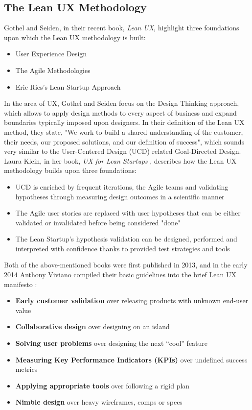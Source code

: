 \documentclass{article}
\begin{document}
\subsection{The Lean UX Methodology}
Gothel and Seiden, in their recent book, \textit{Lean UX}, \cite{gothelf2016lean} highlight three foundations upon which the Lean UX methodology is built:
\begin{itemize}
  \item User Experience Design
  \item The Agile Methodologies
  \item Eric Ries's Lean Startup Approach
\end{itemize}
In the area of UX, Gothel and Seiden focus on the Design Thinking approach, which allows to apply design methods to every aspect of business and expand boundaries typically imposed upon designers. In their definition of the Lean UX method, they state, "We work to build a shared understanding of the customer, their needs, our
proposed solutions, and our definition of success", which sounds very similar to the User-Centered Design (UCD) related Goal-Directed Design.
Laura Klein, in her book, \textit{UX for Lean Startups} \cite{klein2013ux}, describes how the Lean UX methodology builds upon three foundations:
\begin{itemize}
  \item UCD is enriched by frequent iterations, the Agile teams and validating hypotheses through measuring design outcomes in a scientific manner
  \item The Agile user stories are replaced with user hypotheses that can be either validated or invalidated before being considered "done"
  \item The Lean Startup's hypothesis validation can be designed, performed and interpreted with confidence thanks to provided test strategies and tools
\end{itemize}
Both of the above-mentioned books were first published in 2013, and in the early 2014 Anthony Viviano compiled their basic guidelines into the brief Lean UX manifesto \cite{viviano2014lean}:
\begin{itemize}
  \item \textbf{Early customer validation} over releasing products with unknown end-user value
  \item \textbf{Collaborative design} over designing on an island
  \item \textbf{Solving user problems} over designing the next “cool” feature
  \item \textbf{Measuring Key Performance Indicators (KPIs)} over undefined success metrics
  \item \textbf{Applying appropriate tools} over following a rigid plan
  \item \textbf{Nimble design} over heavy wireframes, comps or specs
\end{itemize}
\end{document}
